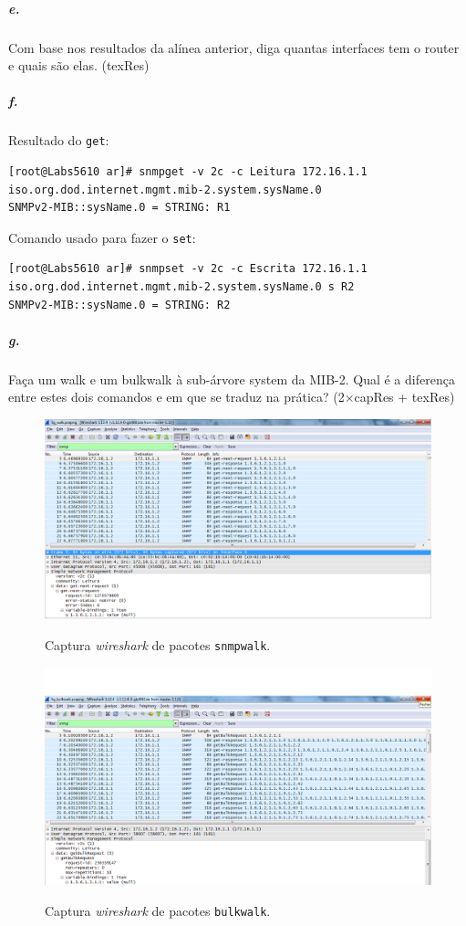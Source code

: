 \subparagraph{e.}
Com base nos resultados da alínea anterior, diga quantas interfaces tem o router e quais são elas. (texRes)


\subparagraph{f.}
Resultado do \texttt{get}:
\begin{verbatim}
[root@Labs5610 ar]# snmpget -v 2c -c Leitura 172.16.1.1 iso.org.dod.internet.mgmt.mib-2.system.sysName.0
SNMPv2-MIB::sysName.0 = STRING: R1
\end{verbatim}

Comando usado para fazer o \texttt{set}:
\begin{verbatim}
[root@Labs5610 ar]# snmpset -v 2c -c Escrita 172.16.1.1 iso.org.dod.internet.mgmt.mib-2.system.sysName.0 s R2
SNMPv2-MIB::sysName.0 = STRING: R2
\end{verbatim}


\subparagraph{g.}
Faça um walk e um bulkwalk à sub-árvore system da MIB-2. Qual é a diferença entre estes dois comandos e em que se traduz na prática? (2×capRes + texRes)

\begin{figure}[h]
\centering
\includegraphics[width=1\textwidth, height=0.33\textheight]{5g_walk.png}
\label{fig:8-capturaWireshark}
\caption{Captura \emph{wireshark} de pacotes \texttt{snmpwalk}.}
\end{figure}

\begin{figure}[h]
\centering
\includegraphics[width=1\textwidth, height=0.33\textheight]{5g_bulkwalk.png}
\label{fig:9-capturaWireshark}
\caption{Captura \emph{wireshark} de pacotes \texttt{bulkwalk}.}
\end{figure}


